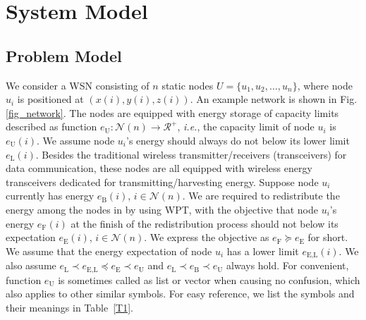 \documentclass[journal,10pt]{IEEEtran}
\begin{document}
\section{System Model}
\label{sec_model}
\subsection{Problem Model}

We consider a WSN consisting of $n$ static nodes $U{=}\{u_1, u_2, \ldots, u_n\}$, where node $u_i$ is positioned at $(x(i),y(i),z(i))$. An example network is shown in Fig.\ref{fig_network}. The nodes are equipped with energy storage of capacity limits described as function $e_\text{U}{:}\mathcal{N}(n){\rightarrow}\mathcal{R^{+}}$, \textit{i.e.}, the capacity limit of node $u_i$ is $e_\text{U}(i)$. We assume node $u_i$'s energy should always do not below its lower limit $e_\text{L}(i)$. Besides the traditional wireless transmitter/receivers (transceivers) for data communication, these nodes are all equipped with wireless energy transceivers dedicated for transmitting/harvesting energy. Suppose node $u_i$ currently has energy $e_\text{B}(i)$, $i{\in}\mathcal{N}(n)$. We are required to redistribute the energy among the nodes in by using WPT, with the objective that node $u_i$'s energy $e_\text{F}(i)$ at the finish of the redistribution process should not below its expectation $e_\text{E}(i)$, $i{\in}\mathcal{N}(n)$. We express the objective as $e_\text{F}{\succeq}e_\text{E}$ for short. We assume that the energy expectation of node $u_i$ has a lower limit $e_\text{E,L}(i)$. We also assume $e_\text{L}{\prec}e_\text{E,L}{\preceq}e_\text{E}{\prec}e_\text{U}$ and $e_\text{L}{\prec}e_\text{B}{\prec}e_\text{U}$ always hold. For convenient, function $e_\text{U}$ is sometimes called as list or vector when causing no confusion, which also applies to other similar symbols. For easy reference, we list the symbols and their meanings in Table~\ref{T1}.
\end{document}
